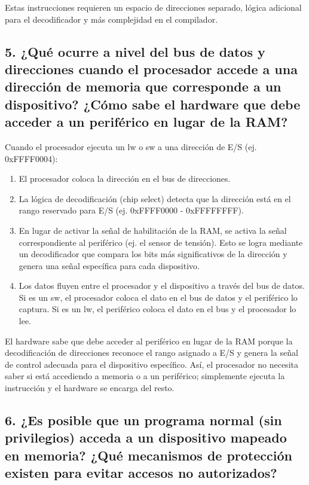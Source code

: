 \documentclass[12pt]{article}
\begin{document}
Estas instrucciones requieren un espacio de direcciones separado, lógica adicional para el decodificador y más complejidad en el compilador.

\subsection*{5. ¿Qué ocurre a nivel del bus de datos y direcciones cuando el procesador accede a una dirección de memoria que corresponde a un dispositivo? ¿Cómo sabe el hardware que debe acceder a un periférico en lugar de la RAM?}

Cuando el procesador ejecuta un lw o sw a una dirección de E/S (ej. 0xFFFF0004):

\begin{enumerate}
    \item El procesador coloca la dirección en el bus de direcciones.
    \item La lógica de decodificación (chip select) detecta que la dirección está en el rango reservado para E/S (ej. 0xFFFF0000 - 0xFFFFFFFF).
    \item En lugar de activar la señal de habilitación de la RAM, se activa la señal correspondiente al periférico (ej. el sensor de tensión). Esto se logra mediante un decodificador que compara los bits más significativos de la dirección y genera una señal específica para cada dispositivo.
    \item Los datos fluyen entre el procesador y el dispositivo a través del bus de datos. Si es un sw, el procesador coloca el dato en el bus de datos y el periférico lo captura. Si es un lw, el periférico coloca el dato en el bus y el procesador lo lee.
\end{enumerate}

El hardware sabe que debe acceder al periférico en lugar de la RAM porque la decodificación de direcciones reconoce el rango asignado a E/S y genera la señal de control adecuada para el dispositivo específico. Así, el procesador no necesita saber si está accediendo a memoria o a un periférico; simplemente ejecuta la instrucción y el hardware se encarga del resto.

\subsection*{6. ¿Es posible que un programa normal (sin privilegios) acceda a un dispositivo mapeado en memoria? ¿Qué mecanismos de protección existen para evitar accesos no autorizados?}
\end{document}
